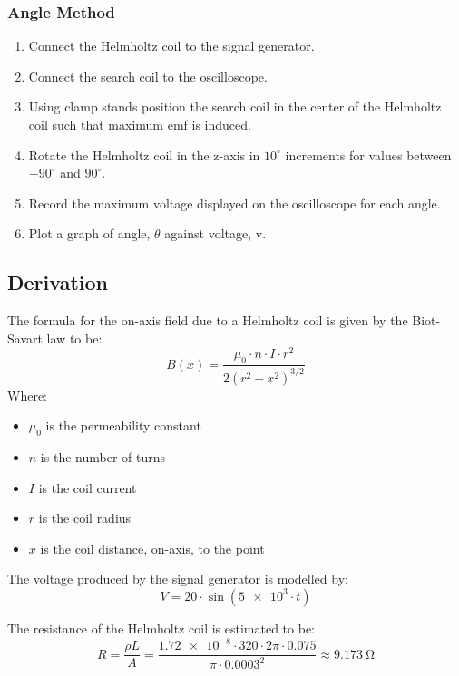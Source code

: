 \subsubsection{Angle Method}
\begin{enumerate}
    \item Connect the Helmholtz coil to the signal generator.
    \item Connect the search coil to the oscilloscope.
    \item Using clamp stands position the search coil in the center of the Helmholtz coil such that maximum emf is induced.
    \item Rotate the Helmholtz coil in the z-axis in $10^{\circ}$  increments for values between $-90^{\circ}$ and $90^{\circ}$.
    \item Record the maximum voltage displayed on the oscilloscope for each angle.
    \item Plot a graph of angle, $\theta$ against voltage, v.
\end{enumerate}

\subsection{Derivation}
The formula for the on-axis field due to a Helmholtz coil is given by the Biot-Savart law\cite{wiki:biotsavart} to be:
\begin{equation*}
    B\left(x\right) = \frac{\mu_0  \cdot n  \cdot I  \cdot r^2}{2\left(r^2 + x^2\right)^{3/2}}
\end{equation*}
Where:
\begin{itemize}
    \item $\mu_0$ is the permeability constant
    \item $n$ is the number of turns
    \item $I$ is the coil current
    \item $r$ is the coil radius
    \item $x$ is the coil distance, on-axis, to the point
\end{itemize}

The voltage produced by the signal generator is modelled by:
\begin{equation*}
    V = 20 \cdot \sin \left( \num{5e3} \cdot t \right)
\end{equation*}

The resistance of the Helmholtz coil is estimated to be:
\begin{equation*}
    R = \frac{\rho L}{A} = \frac{\num{1.72e-8} \cdot 320 \cdot 2 \pi \cdot 0.075}{\pi \cdot 0.0003^2} \approx \SI{9.173}{\ohm}
\end{equation*}

